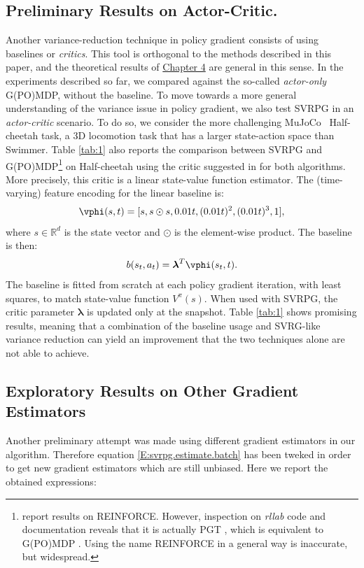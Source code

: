 \subsection{Preliminary Results on Actor-Critic.}\label{subsec:actorcritic} %
Another variance-reduction technique in policy gradient consists of using baselines or \textit{critics}. This tool is orthogonal to the methods described in this paper, and the theoretical results of \hyperref[chap:convergence]{Chapter 4} are general in this sense. In the experiments described so far, we compared against the so-called \textit{actor-only} G(PO)MDP, \ie without the baseline. To move towards a more general understanding of the variance issue in policy gradient, we also test \acs{SVRPG} in an \textit{actor-critic} scenario. To do so, we consider the more challenging MuJoCo~\citep{todorov2012mujoco} Half-cheetah task, a 3D locomotion task that has a larger state-action space than Swimmer. Table \ref{tab:1} also reports the comparison between \acs{SVRPG} and G(PO)MDP\footnote{\citet{duan2016benchmarking} report results on REINFORCE. However, inspection on \textit{rllab} code and documentation reveals that it is actually \ac{PGT} \cite{sutton2000policy}, which is equivalent to G(PO)MDP \citep[shown by][]{peters2008reinforcement}. Using the name REINFORCE in a general way is inaccurate, but widespread.} on Half-cheetah using the critic suggested in \cite{duan2016benchmarking} for both algorithms. More precisely, this critic is a linear state-value function estimator. 
The (time-varying) feature encoding for the linear baseline is:
\begin{align*}
\vphi(s,t)=[s, s \odot s, 0.01t, (0.01t)^2, (0.01t)^3,1],
\end{align*}
where $s\in\mathbb{R}^d$ is the state vector and $\odot$ is the element-wise product. The baseline is then:
\[
b(s_t,a_t) = \boldsymbol{\lambda}^T\vphi(s_t,t).
\]
The baseline is fitted from scratch at each policy gradient iteration, with least squares, to match state-value function $V^{\pi}(s)$.
When used with \acs{SVRPG}, the critic parameter $\boldsymbol{\lambda}$ is updated only at the snapshot. Table \ref{tab:1} shows promising results, meaning that a combination of the baseline usage and \acs{SVRG}-like variance reduction can yield an improvement that the two techniques alone are not able to achieve.
\subsection{Exploratory Results on Other Gradient Estimators}
Another preliminary attempt was made using different gradient estimators in our algorithm. Therefore equation \eqref{E:svrpg.estimate.batch} has been tweked in order to get new gradient estimators which are still unbiased. Here we report the obtained expressions:



